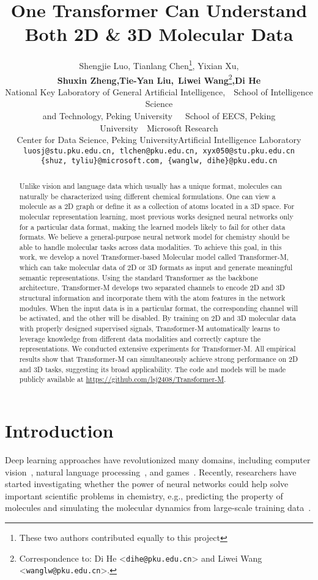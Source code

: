\documentclass{article} \usepackage[dvipsnames]{xcolor}
\title{One Transformer Can Understand \\ Both 2D \& 3D Molecular Data}
\author{Shengjie Luo, \quad\qquad Tianlang Chen\thanks{These two authors contributed equally to this project}, \qquad Yixian Xu, \\ \textbf{Shuxin Zheng}\textbf{,}\quad\qquad \textbf{Tie-Yan Liu}\textbf{,}\quad\qquad\ \quad  \textbf{Liwei Wang}\thanks{Correspondence to: Di He <\texttt{dihe@pku.edu.cn}> and Liwei Wang <\texttt{wanglw@pku.edu.cn}>.}\textbf{,}\quad\qquad \textbf{Di He}\\
National Key Laboratory of General Artificial Intelligence,\ \ School of Intelligence Science\\and Technology, Peking University\ \ \ School of EECS, Peking University\ \ Microsoft Research\\Center for Data Science, Peking University\quad\quad\quadShanghai Artificial Intelligence Laboratory\\
\texttt{\footnotesize luosj@stu.pku.edu.cn, tlchen@pku.edu.cn, xyx050@stu.pku.edu.cn}\\
\texttt{\footnotesize \{shuz, tyliu\}@microsoft.com, \{wanglw, dihe\}@pku.edu.cn} \\
}
\begin{document}
\vspace{-18pt}
\maketitle
\vspace{-22pt}
\begin{abstract}
\vspace{-6pt}
Unlike vision and language data which usually has a unique format, molecules can naturally be characterized using different chemical formulations. One can view a molecule as a 2D graph or define it as a collection of atoms located in a 3D space. For molecular representation learning, most previous works designed neural networks only for a particular data format, making the learned models likely to fail for other data formats. We believe a general-purpose neural network model for chemistry should be able to handle molecular tasks across data modalities. To achieve this goal, in this work, we develop a novel Transformer-based Molecular model called Transformer-M, which can take molecular data of 2D or 3D formats as input and generate meaningful semantic representations. Using the standard Transformer as the backbone architecture, Transformer-M develops two separated channels to encode 2D and 3D structural information and incorporate them with the atom features in the network modules. When the input data is in a particular format, the corresponding channel will be activated, and the other will be disabled. By training on 2D and 3D molecular data with properly designed supervised signals, Transformer-M automatically learns to leverage knowledge from different data modalities and correctly capture the representations. We conducted extensive experiments for Transformer-M. All empirical results show that Transformer-M can simultaneously achieve strong performance on 2D and 3D tasks, suggesting its broad applicability. The code and models will be made publicly available at \url{https://github.com/lsj2408/Transformer-M}.
\end{abstract}
\vspace{-16pt}
\section{Introduction}
\vspace{-6pt}
\label{sec-intro}
Deep learning approaches have revolutionized many domains, including computer vision~\citep{he2016deep}, natural language processing~\citep{devlin2019bert,brown2020language}, and games~\citep{mnih2013playing,silver2016mastering}. Recently, researchers have started investigating whether the power of neural networks could help solve important scientific problems in chemistry, e.g., predicting the property of molecules and simulating the molecular dynamics from large-scale training data~\citep{hu2020open,hu2021ogb, zhang2018deep,chanussot2020open}. 
\end{document}
